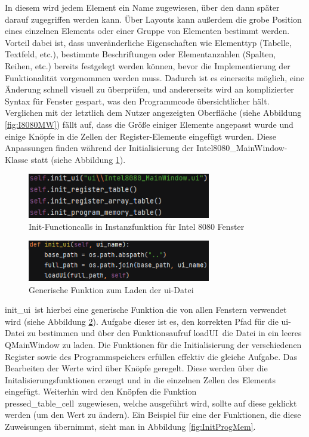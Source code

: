 \documentclass[12pt]{article}
\newcommand{\imgSpaceBefore}{\vspace{10pt}}
\begin{document}
\noindent
In diesem wird jedem Element ein Name zugewiesen, über den dann später darauf zugegriffen werden kann. Über Layouts kann außerdem die grobe Position eines einzelnen Elements oder einer Gruppe von Elementen bestimmt werden. Vorteil dabei ist, dass unveränderliche Eigenschaften wie Elementtyp (Tabelle, Textfeld, etc.), bestimmte Beschriftungen oder Elementanzahlen (Spalten, Reihen, etc.) bereits festgelegt werden können, bevor die Implementierung der Funktionalität vorgenommen werden muss. Dadurch ist es einerseits möglich, eine Änderung schnell visuell zu überprüfen, und andererseits wird an komplizierter Syntax für Fenster gespart, was den Programmcode übersichtlicher hält. Verglichen mit der letztlich dem Nutzer angezeigten Oberfläche (siehe Abbildung \ref{fig:I8080MW}) fällt auf, dass die Größe einiger Elemente angepasst wurde und einige Knöpfe in die Zellen der Register-Elemente eingefügt wurden. Diese Anpassungen finden während der Initialisierung der \glqq Intel8080\_MainWindow\grqq-Klasse statt (siehe Abbildung \ref{fig:InitFuncs}).\imgSpaceBefore

\begin{figure}[H]
\centering
\includegraphics[width=8cm]{bilder/initFuncs}
\caption{Init-Functioncalls in Instanzfunktion für Intel 8080 Fenster}
\label{fig:InitFuncs}
\end{figure}

\vspace{15pt}

\begin{figure}[H]
\centering
\includegraphics[width=8cm]{bilder/initUI}
\caption{Generische Funktion zum Laden der \glqq ui\grqq-Datei}
\label{fig:InitUI}
\end{figure}


\noindent
\glqq init\_ui\grqq\ ist hierbei eine generische Funktion die von allen Fenstern verwendet wird (siehe Abbildung  \ref{fig:InitUI}).
Aufgabe dieser ist es, den korrekten Pfad für die \glqq ui\grqq-Datei zu bestimmen und über den Funktionsaufruf \glqq loadUI\grqq\ die Datei in ein leeres QMainWindow zu laden. Die Funktionen für die Initialisierung der verschiedenen Register sowie des Programmspeichers erfüllen effektiv die gleiche Aufgabe. Das Bearbeiten der Werte wird über Knöpfe geregelt. Diese werden über die Initalisierungsfunktionen erzeugt und in die einzelnen Zellen des Elements eingefügt. Weiterhin wird den Knöpfen die Funktion \glqq pressed\_table\_cell\grqq\ zugewiesen, welche ausgeführt wird, sollte auf diese geklickt werden (um den Wert zu ändern). Ein Beispiel für eine der Funktionen, die diese Zuweisungen übernimmt, sieht man in Abbildung \ref{fig:InitProgMem}.\imgSpaceBefore
\end{document}
